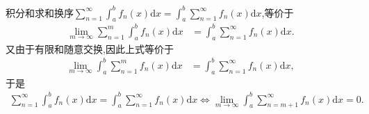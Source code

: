 \documentclass[../../main.tex]{subfiles}%
\begin{document}
积分和求和换序$\sum_{n = 1}^{\infty} \int_{a}^{b} f_n(x) \mathrm{d}x = \int_{a}^{b} \sum_{n = 1}^{\infty} f_n(x) \mathrm{d}x$,等价于
\begin{align*}
\lim_{m \to \infty} \sum_{n = 1}^{m} \int_{a}^{b} f_n(x) \mathrm{d}x &= \int_{a}^{b} \sum_{n = 1}^{\infty} f_n(x) \mathrm{d}x.
\end{align*}
又由于有限和随意交换,因此上式等价于
\begin{align*}
\lim_{m \to \infty} \int_{a}^{b} \sum_{n = 1}^{m} f_n(x) \mathrm{d}x &= \int_{a}^{b} \sum_{n = 1}^{\infty} f_n(x) \mathrm{d}x,
\end{align*}
于是
\begin{align*}
\sum_{n = 1}^{\infty} \int_{a}^{b} f_n(x) \mathrm{d}x = \int_{a}^{b} \sum_{n = 1}^{\infty} f_n(x) \mathrm{d}x \Longleftrightarrow  \lim_{m \to \infty} \int_{a}^{b} \sum_{n = m + 1}^{\infty} f_n(x) \mathrm{d}x = 0.
\end{align*} 
\end{document}

